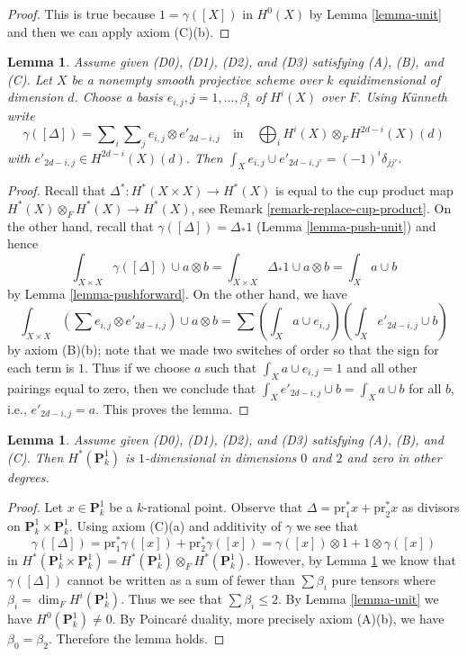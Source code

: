 \documentclass{stacks-project}
\theoremstyle{plain}
\newtheorem{lemma}[subsection]{Lemma}
\theoremstyle{definition}
\theoremstyle{remark}
\numberwithin{equation}{subsection}
\begin{document}
\begin{proof}
This is true because $1 = \gamma([X])$ in $H^0(X)$ by Lemma \ref{lemma-unit}
and then we can apply axiom (C)(b).
\end{proof}

\begin{lemma}
\label{lemma-class-diagonal}
Assume given (D0), (D1), (D2), and (D3) satisfying (A), (B), and (C).
Let $X$ be a nonempty smooth projective scheme over $k$ equidimensional
of dimension $d$. Choose a basis $e_{i, j}, j = 1, \ldots, \beta_i$ of
$H^i(X)$ over $F$. Using K\"unneth write
$$
\gamma([\Delta]) =
\sum\nolimits_i
\sum\nolimits_j e_{i, j} \otimes e'_{2d - i , j}
\quad\text{in}\quad
\bigoplus\nolimits_i H^i(X) \otimes_F H^{2d - i}(X)(d)
$$
with $e'_{2d - i, j} \in H^{2d - i}(X)(d)$.
Then $\int_X e_{i, j} \cup e'_{2d - i, j'} = (-1)^i\delta_{jj'}$.
\end{lemma}

\begin{proof}
Recall that $\Delta^* : H^*(X \times X) \to H^*(X)$ is equal to the
cup product map $H^*(X) \otimes_F H^*(X) \to H^*(X)$, see
Remark \ref{remark-replace-cup-product}. On the other
hand, recall that $\gamma([\Delta]) = \Delta_*1$ (Lemma \ref{lemma-push-unit})
and hence
$$
\int_{X \times X} \gamma([\Delta]) \cup a \otimes b =
\int_{X \times X} \Delta_*1 \cup a \otimes b =
\int_X a \cup b
$$
by Lemma \ref{lemma-pushforward}.
On the other hand, we have
$$
\int_{X \times X} (\sum e_{i, j} \otimes e'_{2d -i , j}) \cup a \otimes b =
\sum (\int_X a \cup e_{i, j})(\int_X e'_{2d - i, j} \cup b)
$$
by axiom (B)(b); note that we made two switches of order so that the sign
for each term is $1$. Thus if we choose $a$ such that
$\int_X a \cup e_{i, j} = 1$ and all other pairings equal to zero, then
we conclude that $\int_X e'_{2d - i, j} \cup b = \int_X a \cup b$
for all $b$, i.e., $e'_{2d - i, j} = a$. This proves the lemma.
\end{proof}

\begin{lemma}
\label{lemma-cohomology-P1}
Assume given (D0), (D1), (D2), and (D3) satisfying (A), (B), and (C).
Then $H^*(\mathbf{P}^1_k)$ is $1$-dimensional in dimensions $0$ and $2$
and zero in other degrees.
\end{lemma}

\begin{proof}
Let $x \in \mathbf{P}^1_k$ be a $k$-rational point. Observe that
$\Delta = \text{pr}_1^*x + \text{pr}_2^*x$ as divisors on
$\mathbf{P}^1_k \times \mathbf{P}^1_k$. Using axiom (C)(a)
and additivity of $\gamma$ we see that
$$
\gamma([\Delta]) =
\text{pr}_1^*\gamma([x]) +
\text{pr}_2^*\gamma([x]) =
\gamma([x]) \otimes 1 + 1 \otimes \gamma([x])
$$
in $H^*(\mathbf{P}^1_k \times \mathbf{P}^1_k) =
H^*(\mathbf{P}^1_k) \otimes_F H^*(\mathbf{P}^1_k)$.
However, by Lemma \ref{lemma-class-diagonal}
we know that $\gamma([\Delta])$ cannot be written
as a sum of fewer than $\sum \beta_i$ pure tensors
where $\beta_i = \dim_F H^i(\mathbf{P}^1_k)$.
Thus we see that $\sum \beta_i \leq 2$.
By Lemma \ref{lemma-unit} we have $H^0(\mathbf{P}^1_k) \not = 0$.
By Poincar\'e duality, more precisely axiom (A)(b),
we have $\beta_0 = \beta_2$. Therefore the lemma holds.
\end{proof}
\end{document}
